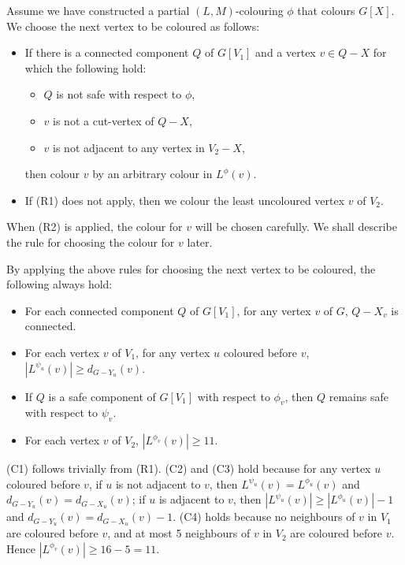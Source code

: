 \documentclass[11pt,a4paper]{article}
\theoremstyle{definition}
\begin{document}
Assume we have constructed a partial $(L,M)$-colouring $\phi$ that colours $G[X]$. We choose the next vertex to be coloured as follows:
\begin{itemize}
\item[(R1)] If there is a connected component $Q$ of $G[V_1]$ and a vertex $v \in Q-X$ for which the following hold:
\begin{itemize}
    \item $Q$ is not safe with respect to $\phi$,
    \item $v$ is not a cut-vertex of $Q-X$, 
    \item $v$ is not adjacent to any vertex in $V_2-X$,
\end{itemize}   
then colour $v$ by an arbitrary colour in $L^{\phi}(v)$.
\item[(R2)] If (R1) does not apply, then we colour the least uncoloured vertex $v$ of $V_2$.
\end{itemize}

When (R2) is applied, the colour for $v$ will be chosen carefully. We shall describe the rule for choosing the colour for $v$ later. 




By applying the above rules for choosing the next vertex to be coloured, the following always hold:
\begin{itemize}
\item[(C1)] For each connected component $Q$ of $G[V_1]$, for any vertex $v$ of $G$, $Q-X_v$ is connected.
\item[(C2)] For each vertex $v$ of $V_1$, for any vertex $u$ coloured before $v$,  $|L^{\psi_u}(v)| \ge d_{G-Y_u}(v)$. 
\item[(C3)] If $Q$ is a safe component of $G[V_1]$ with respect to $\phi_v$, then $Q$ remains safe with respect to $\psi_v$.
\item[(C4)] For each vertex $v$ of $V_2$, $|L^{\phi_v}(v)| \ge 11$.
\end{itemize}
(C1) follows trivially from (R1).   (C2) and (C3) hold because for any vertex   $u$ coloured before $v$,  if $u$ is not adjacent to $v$, then $L^{\psi_u}(v) = L^{\phi_u}(v)$ and $ d_{G-Y_u}(v) = d_{G-X_u}(v)$; if $u$ is  adjacent to $v$, then $|L^{\psi_u}(v)| \ge  |L^{\phi_u}(v)|-1$ and $ d_{G-Y_u}(v)=d_{G-X_u}(v) -1$.   (C4) holds because no neighbours of $v$ in $V_1$ are coloured before $v$, and at most 5 neighbours of $v$ in $V_2$ are coloured before $v$. Hence $|L^{\phi_v}(v)| \ge 16-5=11$.
\end{document}
